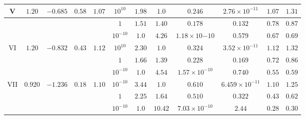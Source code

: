 \documentclass[twocolumn,aps,showpacs,showkeys,prd,superscriptaddress,byrevtex, amsmath]{revtex4-1}
\begin{document}
\begin{table}
\begin{tabular}{c c c c c  c c c c c c c}
\hline   
V & $1.20$ & $-0.685$ & $0.58$ & $1.07$ & $10^{10}$ & $1.98$ & $1.0$ & $0.246$ & $2.76 \times 10^{-11}$ & $1.07$ & $1.31$\\ 
\hline 
 &  &  &  &  & $1$ & $1.51$ & $1.40$ & $0.178$ & $0.132$ & $0.78$ & $0.87$ \\ 
\hline 
 &  &  &  &  & $10^{-10}$ & $1.0$ & $4.26$ & $1.18 \times 10{-10}$ & $0.579$ & $0.67$ & $0.69$ \\ 
\hline   
VI & $1.20$ & $-0.832$ & $0.43$ & $1.12$ & $10^{10}$ & $2.30$ & $1.0$ & $0.324$ & $3.52 \times 10^{-11}$ & $1.12$ & $1.32$ \\ 
\hline 
 &  &  &  &  & $1$ & $1.66$ & $1.39$ & $0.228$ & $0.169$ & $0.72$ & $0.86$ \\ 
\hline 
 &  &  &  &  & $10^{-10}$ & $1.0$ & $4.54$ & $1.57 \times 10^{-10}$ & $0.740$ & $0.55$ & $0.59$ \\ 
\hline 
VII & $0.920$ & $-1.236$ & $0.18$ & $1.10$ & $10^{-10}$ & $3.44$ & $1.0$ & $0.610$ & $6.459 \times 10^{-11}$ & $1.10$ & $1.25$ \\ 
\hline 
 &  &  &  &  & $1$ & $2.25$ & $1.64$ & $0.510$ & $0.322$ & $0.43$ & $0.62$\\ 
\hline 
 &  &  &  &  & $10^{-10}$ & $1.0$ & $10.42$ & $7.03 \times 10^{-10}$ & $2.44$ & $0.28$ & $0.30$\\ 
\hline 
\end{tabular}
\end{table}
\end{document}
